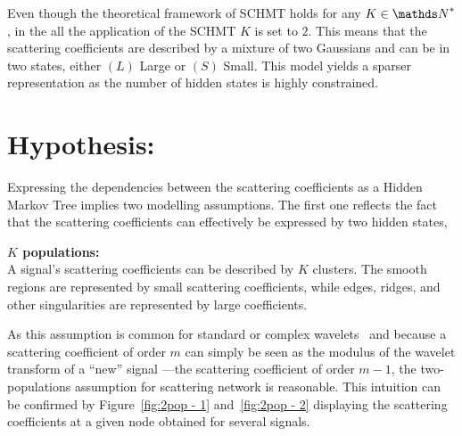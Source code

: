 \documentclass[a4paper,11pt]{report}
\begin{document}
    Even though the theoretical framework of SCHMT holds for any $K \in \dsN^{\ast}$, in the all the application of the SCHMT $K$ is set to $2$. This means that the scattering coefficients are described by a mixture of two Gaussians and can be in two states, either $(L)$ Large or $(S)$ Small. This model yields a sparser representation as the number of hidden states is highly constrained.
    
    
  \section{Hypothesis:}
    \label{sec:SCHMT/Hypos}
    
    Expressing the dependencies between the scattering coefficients as a Hidden Markov Tree implies two modelling assumptions. The first one reflects the fact that the scattering coefficients can effectively be expressed by two hidden states,\\
    
    \begin{assumption}\textbf{$K$ populations:}\\
			A signal's scattering coefficients can be described by $K$ clusters. The smooth regions are represented by small scattering coefficients, while edges, ridges, and other singularities are represented by large coefficients.\\
			\label{assum:2pop}
    \end{assumption}
    
    As this assumption is common for standard or complex wavelets~\citep{kingsbury2001complex} and because a scattering coefficient of order $m$ can simply be seen as the modulus of the wavelet transform of a ``new'' signal ---\ie the scattering coefficient of order $m-1$, the two-populations assumption for scattering network is reasonable. This intuition can be confirmed by Figure~\ref{fig:2pop - 1} and~\ref{fig:2pop - 2} displaying the scattering coefficients at a given node obtained for several signals.\\
 
\end{document}
